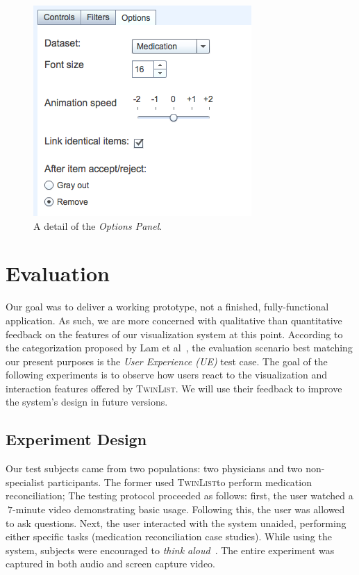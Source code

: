 \documentclass{chi2009}
\newcommand{\TwinList}{\textsc{TwinList}}
\newcommand{\Options}{\textit{Options Panel}}
\begin{document}
\begin{figure}
\begin{center}
\includegraphics[width=1\linewidth]{img/options.png}
\end{center}
   \caption{A detail of the \Options.}
   \label{fig:options}
\end{figure}

\section{Evaluation}
Our goal was to deliver a working prototype, not a finished, fully-functional application. As such, we are more concerned with qualitative than quantitative feedback on the features of our visualization system at this point. According to the categorization proposed by Lam et al~\cite{lam-bertini-isenberg-plaisant-carpendale-2011}, the evaluation scenario best matching our present purposes is the \textit{User Experience (UE)} test case. The goal of the following experiments is to observe how users react to the visualization and interaction features offered by \TwinList. We will use their feedback to improve the system's design in future versions.

\subsection{Experiment Design}
Our test subjects came from two populations: two physicians and two non-specialist participants. The former used \TwinList to perform medication reconciliation; The testing protocol proceeded as follows: first, the user watched a $~7$-minute video demonstrating basic usage. Following this, the user was allowed to ask questions. Next, the user interacted with the system unaided, performing either specific tasks (medication reconciliation case studies). While using the system, subjects were encouraged to \textit{think aloud}~\cite{lewis-1982}. The entire experiment was captured in both audio and screen capture video. 
\end{document}
